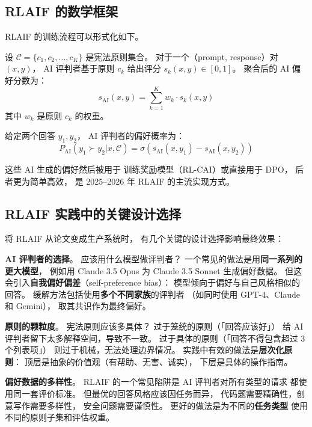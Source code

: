 \subsection{RLAIF 的数学框架}

RLAIF 的训练流程可以形式化如下。

设 $\mathcal{C} = \{c_1, c_2, \ldots, c_K\}$ 是宪法原则集合。
对于一个（prompt, response）对 $(x, y)$，
AI 评判者基于原则 $c_k$ 给出评分 $s_k(x, y) \in [0, 1]$。
聚合后的 AI 偏好分数为：
\begin{equation}
  s_{\text{AI}}(x, y) = \sum_{k=1}^{K} w_k \cdot s_k(x, y)
\end{equation}
其中 $w_k$ 是原则 $c_k$ 的权重。

给定两个回答 $y_1, y_2$，
AI 评判者的偏好概率为：
\begin{equation}
  P_{\text{AI}}(y_1 \succ y_2 | x, \mathcal{C}) =
  \sigma\!\left(s_{\text{AI}}(x, y_1) - s_{\text{AI}}(x, y_2)\right)
\end{equation}

这些 AI 生成的偏好然后被用于
训练奖励模型（RL-CAI）或直接用于 DPO，
后者更为简单高效，
是 2025--2026 年 RLAIF 的主流实现方式。

\subsection{RLAIF 实践中的关键设计选择}

将 RLAIF 从论文变成生产系统时，
有几个关键的设计选择影响最终效果：

\textbf{AI 评判者的选择}。
应该用什么模型做评判者？
一个常见的做法是用\textbf{同一系列的更大模型}，
例如用 Claude 3.5 Opus 为 Claude 3.5 Sonnet 生成偏好数据。
但这会引入\textbf{自我偏好偏差}（self-preference bias）：
模型倾向于偏好与自己风格相似的回答。
缓解方法包括使用\textbf{多个不同家族}的评判者
（如同时使用 GPT-4、Claude 和 Gemini），
取其共识作为最终偏好。

\textbf{原则的颗粒度}。
宪法原则应该多具体？
过于笼统的原则（「回答应该好」）
给 AI 评判者留下太多解释空间，导致不一致。
过于具体的原则（「回答不得包含超过 3 个列表项」）
则过于机械，无法处理边界情况。
实践中有效的做法是\textbf{层次化原则}：
顶层是抽象的价值观（有帮助、无害、诚实），
下层是具体的操作指南。

\textbf{偏好数据的多样性}。
RLAIF 的一个常见陷阱是
AI 评判者对所有类型的请求
都使用同一套评价标准。
但最优的回答风格应该因任务而异，
代码题需要精确性，创意写作需要多样性，
安全问题需要谨慎性。
更好的做法是为不同的\textbf{任务类型}
使用不同的原则子集和评估权重。

